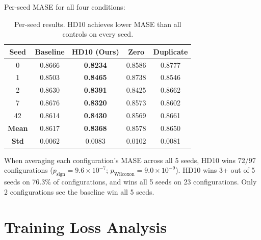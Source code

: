 \documentclass{article}
\begin{document}
Per-seed MASE for all four conditions:

\begin{table}[h]
\centering
\caption{Per-seed results. HD10 achieves lower MASE than all controls on every seed.}
\small
\begin{tabular}{ccccc}
\toprule
\textbf{Seed} & \textbf{Baseline} & \textbf{HD10 (Ours)} & \textbf{Zero} & \textbf{Duplicate} \\
\midrule
0 & 0.8666 & \textbf{0.8234} & 0.8586 & 0.8777 \\
1 & 0.8503 & \textbf{0.8465} & 0.8738 & 0.8546 \\
2 & 0.8630 & \textbf{0.8391} & 0.8425 & 0.8662 \\
7 & 0.8676 & \textbf{0.8320} & 0.8573 & 0.8602 \\
42 & 0.8614 & \textbf{0.8430} & 0.8569 & 0.8661 \\
\midrule
\textbf{Mean} & 0.8617 & \textbf{0.8368} & 0.8578 & 0.8650 \\
\textbf{Std} & 0.0062 & 0.0083 & 0.0102 & 0.0081 \\
\bottomrule
\end{tabular}
\end{table}

When averaging each configuration's MASE across all 5 seeds, HD10 wins 72/97 configurations ($p_{\text{sign}} = 9.6 \times 10^{-7}$; $p_{\text{Wilcoxon}} = 9.0 \times 10^{-9}$). HD10 wins 3+ out of 5 seeds on 76.3\% of configurations, and wins all 5 seeds on 23 configurations. Only 2 configurations see the baseline win all 5 seeds.

\section{Training Loss Analysis}
\label{app:trainloss}
\end{document}
